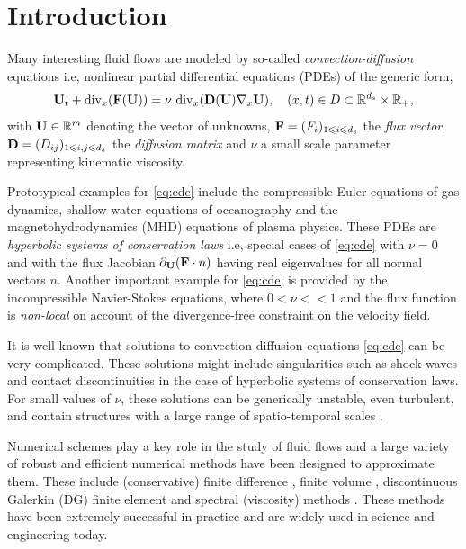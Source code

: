 \documentclass[a4paper]{article}
\numberwithin{equation}{section}
\numberwithin{equation}{section}
\theoremstyle{definition}
\theoremstyle{myremarkstyle}
\renewcommand{\leq}{\leqslant}
\newcommand{\R}{\mathbb{R}}
\newcommand{\U}{{\bf U}}		%
\newcommand{\F}{{\bf F}}
\begin{document}
\section{Introduction}
Many interesting fluid flows are modeled by so-called \emph{convection-diffusion} equations \cite{LanLip1} i.e, nonlinear partial differential equations (PDEs) of the generic form,
\begin{equation}
\label{eq:cde}
\U_t + {\rm div}_x (\F(\U)) = \nu ~{\rm div}_x({\bf D}(\U) \nabla_x \U), \quad (x,t) \in D \subset \R^{d_s} \times \R_+,
\end{equation}
with $\U\in \R^m$ denoting the vector of unknowns, $\F = (F_i)_{1\leq i \leq d_s}$ the \emph{flux vector}, ${\bf D} = (D_{ij})_{1\leq i,j \leq d_s}$ the 
\emph{diffusion matrix} and $\nu$ a small scale parameter representing kinematic viscosity. 

Prototypical examples for \eqref{eq:cde} include the compressible Euler equations of gas dynamics, shallow water equations of oceanography and the magnetohydrodynamics (MHD) equations of plasma
physics. These PDEs are \emph{hyperbolic systems of conservation laws} i.e, special cases of \eqref{eq:cde} with  $\nu = 0$ and with the flux Jacobian $\partial_{\U} (\F\cdot n)$ having real eigenvalues for all normal vectors $n$. Another important example for \eqref{eq:cde} is provided by the incompressible Navier-Stokes equations, where $0 < \nu << 1$ and the flux function is \emph{non-local} on account of the divergence-free constraint on the velocity field. 

It is well known that solutions to convection-diffusion equations \eqref{eq:cde} can be very complicated. These solutions might include singularities such as shock waves and contact discontinuities in the case of hyperbolic systems of conservation laws.
For small values of $\nu$, these solutions can be generically unstable, even turbulent, and contain structures with a large range of spatio-temporal scales \cite{LanLip1}.

Numerical schemes play a key role in the study of fluid flows and a large variety of robust and efficient numerical methods have been designed to approximate them. These include (conservative) finite difference \cite{LEV2}, finite volume \cite{GR1,HEST1}, discontinuous Galerkin (DG) finite element \cite{HEST1} and spectral (viscosity) methods \cite{Ors1}. These methods have been extremely successful in practice and are widely used in science and engineering today.
\end{document}
